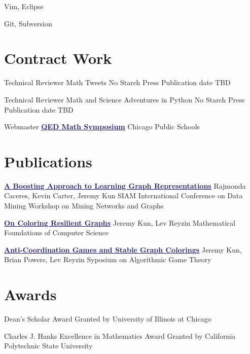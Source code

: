 \documentclass[11pt]{moderncv}
\begin{document}
         {Vim, Eclipse}
      {}
{}
      {}
      {}

         {Git, Subversion}
      {}
{}
      {}
      {}


   \section{Contract Work}
         {Technical Reviewer}
      {Math Tweets}
      {No Starch Press}
      {}
      {Publication date TBD}

         {Technical Reviewer}
      {Math and Science Adventures in Python}
      {No Starch Press}
      {}
      {Publication date TBD}

         {Webmaster}
      {\href{http://qed.wpcp.org/}{\textcolor{MidnightBlue}{\underline{\textbf{QED Math Symposium}}}}}
      {Chicago Public Schools}
      {}
{}


   \section{Publications}
         {\href{http://arxiv.org/abs/1401.3258}{\textcolor{MidnightBlue}{\underline{\textbf{A Boosting Approach to Learning Graph Representations}}}}}
      {Rajmonda Caceres, Kevin Carter, Jeremy Kun}
      {SIAM International Conference on Data Mining Workshop on Mining Networks and Graphs}
      {}
      {}

         {\href{http://arxiv.org/abs/1402.4376}{\textcolor{MidnightBlue}{\underline{\textbf{On Coloring Resilient Graphs}}}}}
      {Jeremy Kun, Lev Reyzin}
      {Mathematical Foundations of Computer Science}
      {}
      {}

         {\href{http://arxiv.org/abs/1308.3258}{\textcolor{MidnightBlue}{\underline{\textbf{Anti-Coordination Games and Stable Graph Colorings}}}}}
      {Jeremy Kun, Brian Powers, Lev Reyzin}
      {Syposium on Algorithmic Game Theory}
      {}
      {}


   \section{Awards}
         {Dean's Scholar Award}
{}
      {Granted by University of Illinois at Chicago}
      {}
      {}

         {Charles J. Hanks Excellence in Mathematics Award}
{}
      {Granted by California Polytechnic State University}
      {}
      {}
\end{document}
